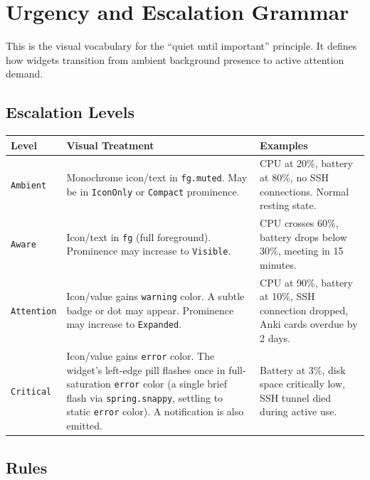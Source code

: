 \documentclass[11pt,a4paper]{article}
\begin{document}
\section{Urgency and Escalation Grammar}
\label{sec:urgency}

This is the visual vocabulary for the ``quiet until important'' principle. It defines how widgets transition from ambient background presence to active attention demand.

\subsection{Escalation Levels}

\begin{longtable}{p{2.5cm} p{3.5cm} p{7.5cm}}
\toprule
\textbf{Level} & \textbf{Visual Treatment} & \textbf{Examples} \\
\midrule
\texttt{Ambient} & Monochrome icon/text in \texttt{fg.muted}. May be in \texttt{IconOnly} or \texttt{Compact} prominence. & CPU at 20\%, battery at 80\%, no SSH connections. Normal resting state. \\
\addlinespace
\texttt{Aware} & Icon/text in \texttt{fg} (full foreground). Prominence may increase to \texttt{Visible}. & CPU crosses 60\%, battery drops below 30\%, meeting in 15 minutes. \\
\addlinespace
\texttt{Attention} & Icon/value gains \texttt{warning} color. A subtle badge or dot may appear. Prominence may increase to \texttt{Expanded}. & CPU at 90\%, battery at 10\%, SSH connection dropped, Anki cards overdue by 2 days. \\
\addlinespace
\texttt{Critical} & Icon/value gains \texttt{error} color. The widget's left-edge pill flashes once in full-saturation \texttt{error} color (a single brief flash via \texttt{spring.snappy}, settling to static \texttt{error} color). A notification is also emitted. & Battery at 3\%, disk space critically low, SSH tunnel died during active use. \\
\bottomrule
\end{longtable}

\subsection{Rules}
\end{document}
